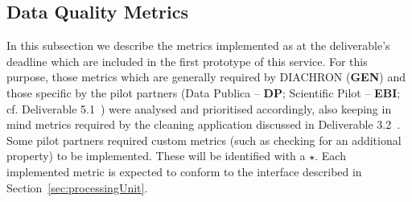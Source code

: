 
\subsection{Data Quality Metrics}
\label{sec:DQMetrics} 



In this subsection we describe the metrics implemented as at the deliverable's deadline which are included in the first prototype of this service.
For this purpose, those metrics which are generally required by DIACHRON (\textbf{GEN}) and those specific by the pilot partners (Data Publica – \textbf{DP};  Scientific Pilot – \textbf{EBI}; cf. Deliverable 5.1~\cite[section 4]{diachron-d5.1}) were analysed and prioritised accordingly, also keeping in mind metrics required by the cleaning application discussed in Deliverable 3.2~\cite{diachron-d3.2}.
Some pilot partners required custom metrics (such as checking for an additional property) to be implemented.
These will be identified with a $\star$.
Each implemented metric is expected to conform to the interface described in Section~\ref{sec:processingUnit}.







